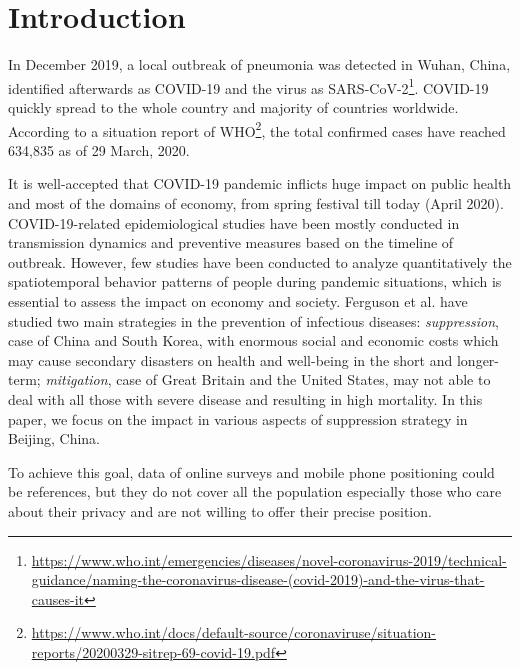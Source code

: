 \documentclass[preprints,ijgi,submit,moreauthors]{Definitions/mdpi}
\begin{document}
\section{Introduction}
In December 2019, a local outbreak of pneumonia was detected in Wuhan, China, identified afterwards as COVID-19 and the virus as SARS-CoV-2\footnote{\url{https://www.who.int/emergencies/diseases/novel-coronavirus-2019/technical-guidance/naming-the-coronavirus-disease-(covid-2019)-and-the-virus-that-causes-it}}.
COVID-19 quickly spread to the whole country and majority of countries worldwide.
According to a situation report of WHO\footnote{\url{https://www.who.int/docs/default-source/coronaviruse/situation-reports/20200329-sitrep-69-covid-19.pdf}}, the total confirmed cases have reached 634,835 as of 29 March, 2020.

It is well-accepted that COVID-19 pandemic inflicts huge impact on public health and most of the domains of economy, from spring festival till today (April 2020).
COVID-19-related epidemiological studies have been mostly conducted in transmission dynamics \cite{li2020early,pitzer2009demographic} and preventive measures \cite{chinazzi2020effect,van2006today} based on the timeline of outbreak.
However, few studies have been conducted to analyze quantitatively the spatiotemporal behavior patterns of people during pandemic situations, which is essential to assess the impact on economy and society.
Ferguson et al. \cite{ferguson2020report} have studied two main strategies in the prevention of infectious diseases: \textit{suppression}, case of China and South Korea, with enormous social and economic costs which may cause secondary disasters on health and well-being in the short and longer-term;
\textit{mitigation}, case of Great Britain and the United States, may not able to deal with all those with severe disease and resulting in high mortality.
In this paper, we focus on the impact in various aspects of suppression strategy in Beijing, China.

To achieve this goal, data of online surveys and mobile phone positioning could be references, but they do not cover all the population especially those who care about their privacy and are not willing to offer their precise position.
\end{document}
